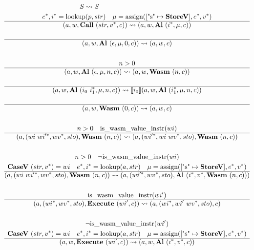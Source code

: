 \begin{gather*}
\newline \\
  S \leadsto S
%
\newline \\
  \seq e, \seq i = \lookup(p, str) \quad \mu = \assign([\text{"s"} \mapsto \storev], \seq e, \seq v) \\
  \hline
  (a, w, \call ~ (str, \seq v, c)) \leadsto (a, w, \al ~ (\seq i, \mu, c)) \\
%
\newline \\
  \hline
  (a, w, \al ~ (\epsilon, \mu, 0, c)) \leadsto (a, w, c) \\
%
\newline \\
  n > 0 \\
  \hline
  (a, w, \al ~ (\epsilon, \mu, n, c)) \leadsto (a, w, \wasm ~ (n, c)) \\
%
\newline \\
  \hline
  (a, w, \al ~ (i_0 ~ \seq{i_1}, \mu, n, c))
  \leadsto
  \sem{i_0}(a, w, \al ~ (\seq{i_1}, \mu, n, c)) \\
%
\newline \\
  \hline
  (a, w, \wasm ~ (0, c)) \leadsto (a, w, c) \\
%
\newline \\
  n > 0 \quad \iswasmvalueinstr(wi) \\
  \hline
  (a, (wi ~ \seq{wi'}, \seq{wv}, sto), \wasm ~ (n, c))
  \leadsto
  (a, (\seq{wi'}, wi ~ \seq{wv}, sto), \wasm ~ (n, c)) \\
%
\newline \\
  n > 0 \quad \neg \iswasmvalueinstr(wi) \\
  \casev ~ (str, \seq v) = wi \quad
  \seq e, \seq i = \lookup(a, str) \quad
  \mu = \assign([\text{"s"} \mapsto \storev], \seq e, \seq v) \\
  \hline
  (a, (wi ~ \seq{wi'}, \seq{wv}, sto), \wasm ~ (n, c))
  \leadsto
  (a, (\seq{wi'}, \seq{wv}, sto), \al ~ (\seq i, \seq v, \wasm ~ (n, c))) \\
%
\newline \\
  \iswasmvalueinstr(wi') \\
  \hline
  (a, (\seq{wi}, \seq{wv}, sto), \exe ~ (wi', c))
  \leadsto
  (a, (\seq{wi}, wi' ~ \seq{wv}, sto), c) \\
%
\newline \\
  \neg \iswasmvalueinstr(wi') \\
  \casev ~ (str, \seq v) = wi \quad
  \seq e, \seq i = \lookup(a, str) \quad
  \mu = \assign([\text{"s"} \mapsto \storev], \seq e, \seq v) \\
  \hline
  (a, w, \exe ~ (wi', c)) \leadsto (a, w, \al ~ (\seq i, \seq v, c)) \\
\end{gather*}




